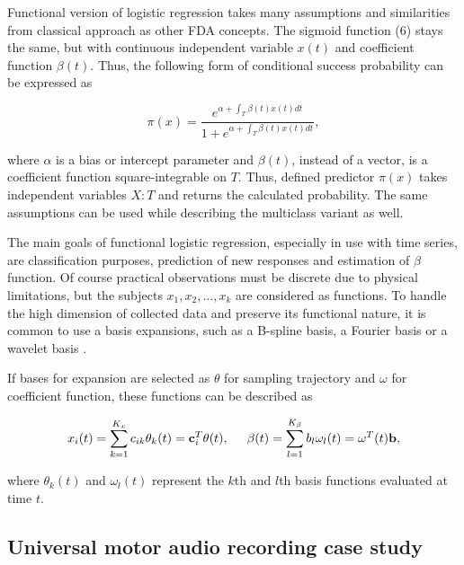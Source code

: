 \documentclass[energies,article,submit,pdftex,moreauthors]{Definitions/mdpi}
\begin{document}
\vspace{5mm}
Functional version of logistic regression takes many assumptions and similarities from classical approach as other FDA concepts. The sigmoid function (6) stays the same, but with continuous independent variable $ x(t) $ and coefficient function $ \beta(t)$. Thus, the following form of conditional success probability can be expressed as
\begin{linenomath}
\begin{equation}
\pi(x) = \frac{e^{\alpha + \int_T \beta(t)x(t)dt}}{1 + e^{\alpha + \int_T \beta(t)x(t)dt}},
\end{equation}
\end{linenomath}
where $\alpha$ is a bias or intercept parameter and $\beta(t)$, instead of a vector, is a coefficient function square-integrable on $T$. Thus, defined predictor $\pi(x)$ takes independent variables $X : T$ and returns the calculated probability. The same assumptions can be used while describing the multiclass variant as well. 

The main goals of functional logistic regression, especially in use with time series, are classification purposes, prediction of new responses and estimation of $\beta$ function. Of course practical observations must be discrete due to physical limitations, but the subjects $x_1, x_2, ..., x_k$ are considered as functions. To handle the high dimension of collected data and preserve its functional nature, it is common to use a basis expansions, such as a B-spline basis, a Fourier basis or a wavelet basis \cite{logreg-comparison}. 

If bases for expansion are selected as $\theta$ for sampling trajectory and $\omega$ for coefficient function, these functions can be described as
\begin{linenomath}
\begin{equation}
x_i(t) = \sum_{k=1}^{K_x} c_{ik} \theta_k (t) = {\bf c}_i^T \theta (t),
\hspace{5mm} \beta(t) = \sum_{l=1}^{K_{\beta}} b_l \omega_l (t) = \omega^T (t) {\bf b},
\end{equation}
\end{linenomath}
where $\theta_k (t)$ and $\omega_l (t)$ represent the $k$th and $l$th basis functions evaluated at time $t$.

\subsection{Universal motor audio recording case study}
\end{document}
